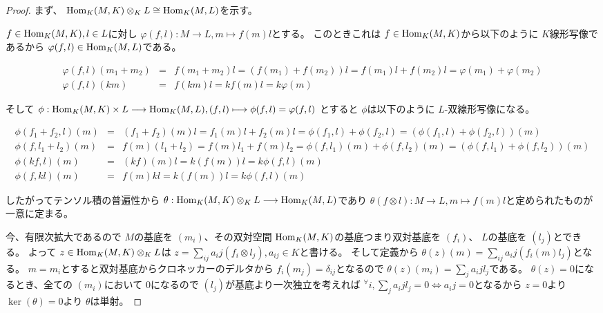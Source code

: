 \documentclass[../master_galois_theory]{subfiles}
\begin{document}
\begin{proof}
  まず、 $\mathrm{Hom}_K (M,K) \otimes_K L \cong \mathrm{Hom}_K (M,L)$を示す。

  $f \in \mathrm{Hom}_K(M,K) , l \in L$に対し $\varphi(f,l) : M \longrightarrow L , m \longmapsto f(m)l$とする。
  このときこれは $f \in \mathrm{Hom}_K(M,K)$から以下のように $K$線形写像であるから $\varphi(f,l) \in \mathrm{Hom}_K(M,L)$である。

  \begin{eqnarray*}
    \varphi (f,l) (m_1 + m_2) & = & f(m_1 + m_2)l = (f(m_1) + f(m_2))l = f(m_1)l + f(m_2)l = \varphi (m_1) + \varphi (m_2) \\
    \varphi (f,l) (km) & = & f(km)l = kf(m)l = k \varphi(m)
  \end{eqnarray*}

  そして $\phi : \mathrm{Hom}_K(M,K) \times L \longrightarrow \mathrm{Hom}_K(M,L) , (f,l) \longmapsto \phi(f,l) = \varphi(f,l)$
  とすると $\phi$は以下のように $L$-双線形写像になる。

  \begin{eqnarray*}
    \phi(f_1 + f_2 , l) (m) & = & (f_1 + f_2)(m)l = f_1(m)l + f_2(m)l = \phi(f_1,l) + \phi(f_2,l) = (\phi(f_1,l) + \phi(f_2,l))(m) \\
    \phi(f , l_1 + l_2) (m) & = & f(m)(l_1 + l_2) = f(m)l_1 + f(m)l_2 = \phi(f,l_1)(m) + \phi(f,l_2)(m) = (\phi(f,l_1) + \phi(f,l_2))(m) \\
    \phi(kf , l) (m) & = & (kf)(m)l = k(f(m))l = k \phi(f,l)(m) \\
    \phi(f,kl) (m) & = & f(m)kl = k(f(m))l = k \phi(f,l)(m)
  \end{eqnarray*}

  したがってテンソル積の普遍性から
  $\theta : \mathrm{Hom}_K (M,K) \otimes_K L \longrightarrow \mathrm{Hom}_K(M,L)$であり
  $\theta (f \otimes l) : M \longrightarrow L , m \longmapsto f(m)l$と定められたものが一意に定まる。

  今、有限次拡大であるので $M$の基底を $(m_i)$、その双対空間 $\mathrm{Hom}_K(M,K)$の基底つまり双対基底を $(f_i)$、 $L$の基底を $(l_j)$とできる。
  よって $z \in \mathrm{Hom}_K(M,K) \otimes_K L$は $z = \sum_{ij} a_ij (f_i \otimes l_j) , a_{ij} \in K$と書ける。
  そして定義から $\theta(z)(m) = \sum_{ij} a_ij (f_i (m) l_j)$となる。
  $m = m_i$とすると双対基底からクロネッカーのデルタから $f_i(m_j) = \delta_{ij}$となるので $\theta(z)(m_i) = \sum_j a_ij l_j$である。
  $\theta (z) = 0$になるとき、全ての $(m_i)$において $0$になるので $(l_j)$が基底より一次独立を考えれば ${}^\forall i , \sum_j a_ij l_j = 0 \Leftrightarrow a_ij = 0$となるから $z = 0$より $\ker (\theta) = 0$より $\theta$は単射。


\end{proof}
\end{document}

